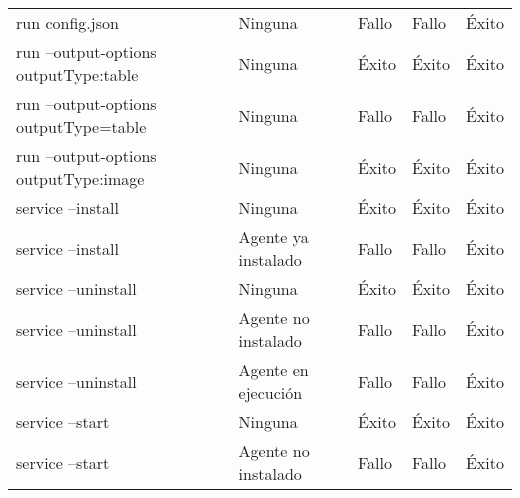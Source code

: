 \begin{table}[H]
{\begin{tabular}{lllll}
                         run config.json                            &   Ninguna                                 &   Fallo                   &   Fallo                   &   Éxito                     \\
                         run --output-options outputType:table      &   Ninguna                                 &   Éxito                   &   Éxito                   &   Éxito                     \\
                         run --output-options outputType=table      &   Ninguna                                 &   Fallo                   &   Fallo                   &   Éxito                     \\
                         run --output-options outputType:image      &   Ninguna                                 &   Éxito                   &   Éxito                   &   Éxito                     \\
                         service --install                          &   Ninguna                                 &   Éxito                   &   Éxito                   &   Éxito                     \\
                         service --install                          &   Agente ya instalado                     &   Fallo                   &   Fallo                   &   Éxito                     \\
                         service --uninstall                        &   Ninguna                                 &   Éxito                   &   Éxito                   &   Éxito                     \\
                         service --uninstall                        &   Agente no instalado                     &   Fallo                   &   Fallo                   &   Éxito                     \\
                         service --uninstall                        &   Agente en ejecución                     &   Fallo                   &   Fallo                   &   Éxito                     \\
                         service --start                            &   Ninguna                                 &   Éxito                   &   Éxito                   &   Éxito                     \\
                         service --start                            &   Agente no instalado                     &   Fallo                   &   Fallo                   &   Éxito                     \\

\end{tabular}}
\end{table}

